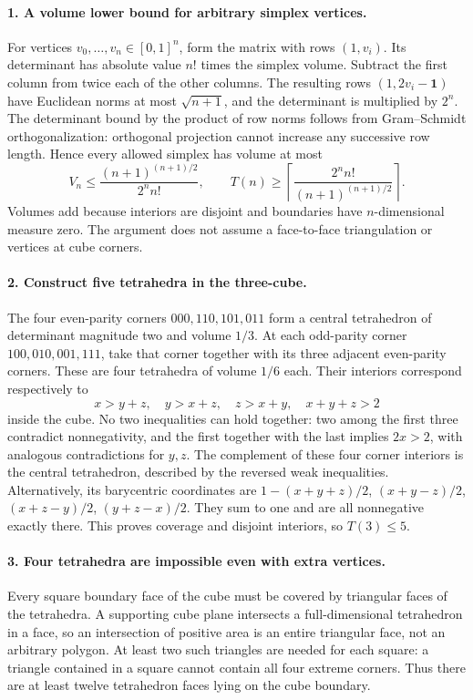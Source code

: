 \documentclass[11pt,a4paper]{article}
\begin{document}
\paragraph{1. A volume lower bound for arbitrary simplex vertices.}
For vertices $v_0,\ldots,v_n\in[0,1]^n$, form the matrix with rows
$(1,v_i)$. Its determinant has absolute value $n!$ times the simplex
volume. Subtract the first column from twice each of the other columns.
The resulting rows $(1,2v_i-\boldsymbol1)$ have Euclidean norms at
most $\sqrt{n+1}$, and the determinant is multiplied by $2^n$.
The determinant bound by the product of row norms follows from
Gram--Schmidt orthogonalization: orthogonal projection cannot increase
any successive row length. Hence every allowed simplex has volume at most
\[
 V_n\le\frac{(n+1)^{(n+1)/2}}{2^n n!},\qquad
 T(n)\ge\left\lceil\frac{2^n n!}{(n+1)^{(n+1)/2}}\right\rceil.
\]
Volumes add because interiors are disjoint and boundaries have
$n$-dimensional measure zero. The argument does not assume a
face-to-face triangulation or vertices at cube corners.

\paragraph{2. Construct five tetrahedra in the three-cube.}
The four even-parity corners $000,110,101,011$ form a central
tetrahedron of determinant magnitude two and volume $1/3$. At each
odd-parity corner $100,010,001,111$, take that corner together with
its three adjacent even-parity corners. These are four tetrahedra of
volume $1/6$ each. Their interiors correspond respectively to
\[
 x>y+z,\quad y>x+z,\quad z>x+y,\quad x+y+z>2
\]
inside the cube. No two inequalities can hold together: two among
the first three contradict nonnegativity, and the first together
with the last implies $2x>2$, with analogous contradictions for
$y,z$. The complement of these four corner interiors is the central
tetrahedron, described by the reversed weak inequalities. Alternatively,
its barycentric coordinates are
$1-(x+y+z)/2$, $(x+y-z)/2$, $(x+z-y)/2$, $(y+z-x)/2$.
They sum to one and are all nonnegative exactly there. This proves
coverage and disjoint interiors, so $T(3)\le5$.

\paragraph{3. Four tetrahedra are impossible even with extra vertices.}
Every square boundary face of the cube must be covered by triangular
faces of the tetrahedra. A supporting cube plane intersects a
full-dimensional tetrahedron in a face, so an intersection of positive
area is an entire triangular face, not an arbitrary polygon. At least
two such triangles are needed for each square: a triangle contained
in a square cannot contain all four extreme corners. Thus there are
at least twelve tetrahedron faces lying on the cube boundary.
\end{document}
